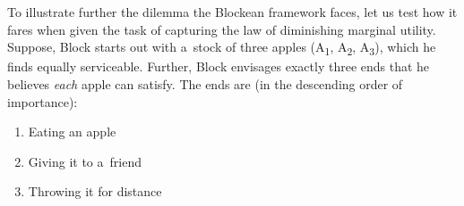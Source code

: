 To illustrate further the dilemma the Blockean framework faces, let us test how it fares when given the task of capturing the law of diminishing marginal utility. Suppose, Block starts out with a~stock of three apples (A\textsubscript{1}, A\textsubscript{2}, A\textsubscript{3}), which he finds equally serviceable. Further, Block envisages exactly three ends that he believes \textit{each} apple can satisfy. The ends are (in the descending order of importance):



\begin{enumerate}

\item Eating an apple

\item Giving it to a~friend

\item Throwing it for distance

\end{enumerate}

